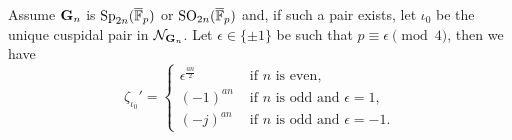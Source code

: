 \documentclass{jt-calcs}
\begin{document}
\begin{thm}
Assume $\mathbf{G}_n$ is $\operatorname{Sp}_{2n}(\overline{\mathbb{F}}_p)$ or $\operatorname{SO}_{2n}(\overline{\mathbb{F}}_p)$ and, if such a pair exists, let $\iota_0$ be the unique cuspidal pair in $\mathcal{N}_{\mathbf{G}_n}$. Let $\epsilon \in \{\pm 1\}$ be such that $p \equiv \epsilon \pmod{4}$, then we have
\begin{equation*}
\zeta_{\iota_0}' =
\begin{cases}
\epsilon^{\frac{an}{2}} &\text{ if }n\text{ is even},\\
(-1)^{an} &\text{ if }n\text{ is odd and }\epsilon=1,\\
(-j)^{an} &\text{ if }n\text{ is odd and }\epsilon=-1.
\end{cases}
\end{equation*}
\end{thm}
\end{document}
